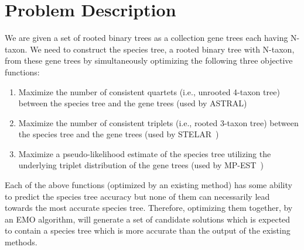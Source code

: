 \section{Problem Description}
\label{sec:problem}
We are given a set of rooted binary trees as a collection gene trees each having N-taxon. We need to construct the species tree, a rooted binary tree with N-taxon, from these gene trees by simultaneously optimizing the following three objective functions:  
\begin{enumerate}[label=Obj\arabic*.]
		
	\item Maximize the number of consistent quartets (i.e., unrooted 4-taxon tree) between the species tree and the gene trees (used by ASTRAL\cite{mirarab2014astral})
	\item Maximize the number of consistent triplets (i.e., rooted 3-taxon tree) between the species tree and the gene trees (used by STELAR~\cite{islam2019stelar})
	\item Maximize a pseudo-likelihood estimate of the species tree utilizing the underlying triplet distribution of the gene trees (used by MP-EST~\cite{liu2010maximum})
\end{enumerate}
Each of the above functions (optimized by an existing method) has some ability to predict the species tree accuracy but none of them can necessarily lead towards the most accurate species tree. Therefore, optimizing them together, by an EMO algorithm, will generate a set of candidate solutions which is expected to contain a species tree which is more accurate than the output of the existing methods.